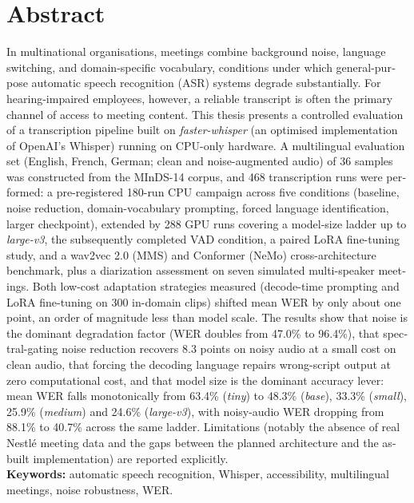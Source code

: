 \documentclass[12pt]{report}
\begin{document}
\section*{Abstract}
\begin{otherlanguage}{english}
In multinational organisations, meetings combine background noise, language switching, and domain-specific vocabulary, conditions under which general-purpose automatic speech recognition (ASR) systems degrade substantially. For hearing-impaired employees, however, a reliable transcript is often the primary channel of access to meeting content. This thesis presents a controlled evaluation of a transcription pipeline built on \textit{faster-whisper} (an optimised implementation of OpenAI's Whisper) running on CPU-only hardware. A multilingual evaluation set (English, French, German; clean and noise-augmented audio) of 36 samples was constructed from the MInDS-14 corpus, and 468 transcription runs were performed: a pre-registered 180-run CPU campaign across five conditions (baseline, noise reduction, domain-vocabulary prompting, forced language identification, larger checkpoint), extended by 288 GPU runs covering a model-size ladder up to \textit{large-v3}, the subsequently completed VAD condition, a paired LoRA fine-tuning study, and a wav2vec 2.0 (MMS) and Conformer (NeMo) cross-architecture benchmark, plus a diarization assessment on seven simulated multi-speaker meetings. Both low-cost adaptation strategies measured (decode-time prompting and LoRA fine-tuning on 300 in-domain clips) shifted mean WER by only about one point, an order of magnitude less than model scale. The results show that noise is the dominant degradation factor (WER doubles from 47.0\% to 96.4\%), that spectral-gating noise reduction recovers 8.3 points on noisy audio at a small cost on clean audio, that forcing the decoding language repairs wrong-script output at zero computational cost, and that model size is the dominant accuracy lever: mean WER falls monotonically from 63.4\% (\textit{tiny}) to 48.3\% (\textit{base}), 33.3\% (\textit{small}), 25.9\% (\textit{medium}) and 24.6\% (\textit{large-v3}), with noisy-audio WER dropping from 88.1\% to 40.7\% across the same ladder. Limitations (notably the absence of real Nestlé meeting data and the gaps between the planned architecture and the as-built implementation) are reported explicitly.
\\
\textbf{Keywords:} automatic speech recognition, Whisper, accessibility, multilingual meetings, noise robustness, WER.
\end{otherlanguage}
\thispagestyle{fancy}
\setcounter{page}{6}
\newpage
{}
\setcounter{page}{7}
\thispagestyle{fancy}
\newpage
\listoffigures
\thispagestyle{fancy}
\newpage
\listoftables
\thispagestyle{fancy}
\newpage
{}
\end{document}

